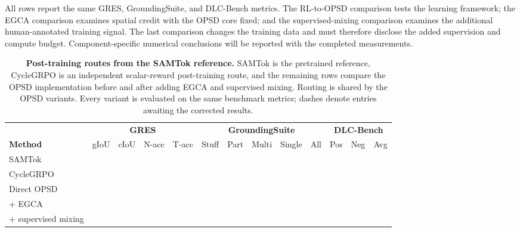 \documentclass{article}
\newcommand{\POna}{\textcolor{POMuted}{\textemdash}}
\newcommand{\POhead}[1]{\textcolor{POInk}{\textbf{#1}}}
\begin{document}
All rows report the same GRES, GroundingSuite, and DLC-Bench metrics. The RL-to-OPSD comparison tests the learning framework; the EGCA comparison examines spatial credit with the OPSD core fixed; and the supervised-mixing comparison examines the additional human-annotated training signal. The last comparison changes the training data and must therefore disclose the added supervision and compute budget. Component-specific numerical conclusions will be reported with the completed measurements.
\begin{table}[t]
\centering
\caption{\textbf{Post-training routes from the SAMTok reference.} SAMTok is the pretrained reference, CycleGRPO is an independent scalar-reward post-training route, and the remaining rows compare the OPSD implementation before and after adding EGCA and supervised mixing. Routing is shared by the OPSD variants. Every variant is evaluated on the same benchmark metrics; dashes denote entries awaiting the corrected results.}
\label{tab:ablation}
\begingroup
\footnotesize
\setlength{\tabcolsep}{2.3pt}
\setlength{\extrarowheight}{0pt}
\renewcommand{\arraystretch}{1.2}
\begin{tabularx}{\textwidth}{>{\raggedright\arraybackslash}X*{12}{r}}
\toprule
& \multicolumn{4}{c}{\POhead{GRES}} & \multicolumn{5}{c}{\POhead{GroundingSuite}} & \multicolumn{3}{c}{\POhead{DLC-Bench}} \\
\cmidrule(lr){2-5}\cmidrule(lr){6-10}\cmidrule(lr){11-13}
\rowcolor{POBlue}
\POhead{Method} & gIoU & cIoU & N-acc & T-acc & Stuff & Part & Multi & Single & All & Pos & Neg & Avg \\
\midrule
SAMTok & \POna & \POna & \POna & \POna & \POna & \POna & \POna & \POna & \POna & \POna & \POna & \POna \\
CycleGRPO & \POna & \POna & \POna & \POna & \POna & \POna & \POna & \POna & \POna & \POna & \POna & \POna \\
\midrule
Direct OPSD & \POna & \POna & \POna & \POna & \POna & \POna & \POna & \POna & \POna & \POna & \POna & \POna \\
\quad + EGCA & \POna & \POna & \POna & \POna & \POna & \POna & \POna & \POna & \POna & \POna & \POna & \POna \\
\rowcolor{POTeal}
\quad + supervised mixing & \POna & \POna & \POna & \POna & \POna & \POna & \POna & \POna & \POna & \POna & \POna & \POna \\
\bottomrule
\end{tabularx}
\endgroup
\end{table}
\end{document}
